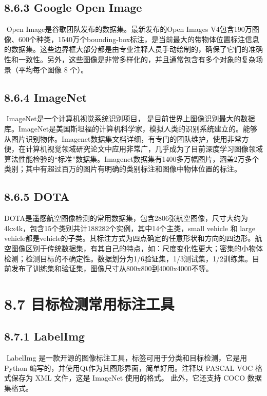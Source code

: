 \subsection{8.6.3 Google Open Image}\label{google-open-image}

​ Open Image是谷歌团队发布的数据集。最新发布的Open Images
V4包含190万图像、600个种类，1540万个bounding-box标注，是当前最大的带物体位置标注信息的数据集。这些边界框大部分都是由专业注释人员手动绘制的，确保了它们的准确性和一致性。另外，这些图像是非常多样化的，并且通常包含有多个对象的复杂场景（平均每个图像
8 个）。

\subsection{8.6.4 ImageNet}\label{imagenet}

​ ImageNet是一个计算机视觉系统识别项目，
是目前世界上图像识别最大的数据库。ImageNet是美国斯坦福的计算机科学家，模拟人类的识别系统建立的。能够从图片识别物体。Imagenet数据集文档详细，有专门的团队维护，使用非常方便，在计算机视觉领域研究论文中应用非常广，几乎成为了目前深度学习图像领域算法性能检验的``标准''数据集。Imagenet数据集有1400多万幅图片，涵盖2万多个类别；其中有超过百万的图片有明确的类别标注和图像中物体位置的标注。

\subsection{8.6.5 DOTA}\label{dota}

​
DOTA是遥感航空图像检测的常用数据集，包含2806张航空图像，尺寸大约为4kx4k，包含15个类别共计188282个实例，其中14个主类，small
vehicle 和 large
vehicle都是vehicle的子类。其标注方式为四点确定的任意形状和方向的四边形。航空图像区别于传统数据集，有其自己的特点，如：尺度变化性更大；密集的小物体检测；检测目标的不确定性。数据划分为1/6验证集，1/3测试集，1/2训练集。目前发布了训练集和验证集，图像尺寸从800x800到4000x4000不等。

\section{8.7
目标检测常用标注工具}\label{ux76eeux6807ux68c0ux6d4bux5e38ux7528ux6807ux6ce8ux5de5ux5177}

\subsection{8.7.1 LabelImg}\label{labelimg}

​ LabelImg 是一款开源的图像标注工具，标签可用于分类和目标检测，它是用
Python 编写的，并使用Qt作为其图形界面，简单好用。注释以 PASCAL VOC
格式保存为 XML 文件，这是 ImageNet 使用的格式。 此外，它还支持 COCO
数据集格式。

